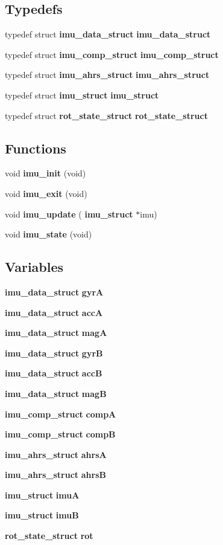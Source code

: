 \subsection*{Typedefs}
\begin{DoxyCompactItemize}
\item 
typedef struct \textbf{ imu\+\_\+data\+\_\+struct} \textbf{ imu\+\_\+data\+\_\+struct}
\item 
typedef struct \textbf{ imu\+\_\+comp\+\_\+struct} \textbf{ imu\+\_\+comp\+\_\+struct}
\item 
typedef struct \textbf{ imu\+\_\+ahrs\+\_\+struct} \textbf{ imu\+\_\+ahrs\+\_\+struct}
\item 
typedef struct \textbf{ imu\+\_\+struct} \textbf{ imu\+\_\+struct}
\item 
typedef struct \textbf{ rot\+\_\+state\+\_\+struct} \textbf{ rot\+\_\+state\+\_\+struct}
\end{DoxyCompactItemize}
\subsection*{Functions}
\begin{DoxyCompactItemize}
\item 
void \textbf{ imu\+\_\+init} (void)
\item 
void \textbf{ imu\+\_\+exit} (void)
\item 
void \textbf{ imu\+\_\+update} (\textbf{ imu\+\_\+struct} $\ast$imu)
\item 
void \textbf{ imu\+\_\+state} (void)
\end{DoxyCompactItemize}
\subsection*{Variables}
\begin{DoxyCompactItemize}
\item 
\textbf{ imu\+\_\+data\+\_\+struct} \textbf{ gyrA}
\item 
\textbf{ imu\+\_\+data\+\_\+struct} \textbf{ accA}
\item 
\textbf{ imu\+\_\+data\+\_\+struct} \textbf{ magA}
\item 
\textbf{ imu\+\_\+data\+\_\+struct} \textbf{ gyrB}
\item 
\textbf{ imu\+\_\+data\+\_\+struct} \textbf{ accB}
\item 
\textbf{ imu\+\_\+data\+\_\+struct} \textbf{ magB}
\item 
\textbf{ imu\+\_\+comp\+\_\+struct} \textbf{ compA}
\item 
\textbf{ imu\+\_\+comp\+\_\+struct} \textbf{ compB}
\item 
\textbf{ imu\+\_\+ahrs\+\_\+struct} \textbf{ ahrsA}
\item 
\textbf{ imu\+\_\+ahrs\+\_\+struct} \textbf{ ahrsB}
\item 
\textbf{ imu\+\_\+struct} \textbf{ imuA}
\item 
\textbf{ imu\+\_\+struct} \textbf{ imuB}
\item 
\textbf{ rot\+\_\+state\+\_\+struct} \textbf{ rot}
\end{DoxyCompactItemize}


